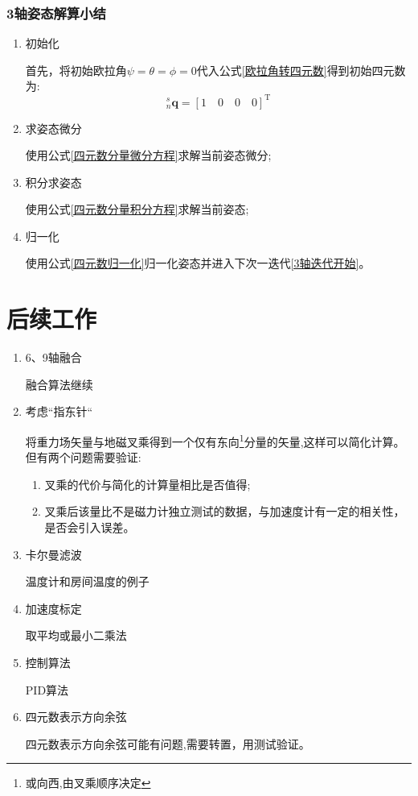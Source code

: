 \documentclass[12pt,a4paper]{article}
\renewcommand{\citep}[1]{\textsuperscript{\cite{#1}}}
\begin{document}
\subsubsection{3轴姿态解算小结}\label{section:3轴姿态解算小结}
\begin{enumerate}
        \item 初始化 
            
            首先，将初始欧拉角$\psi=\theta=\phi=0$代入公式\ref{欧拉角转四元数}得到初始四元数为:
            \begin{equation}\label{四元数初始化}
                ^s_n\bm{q}=[1\quad 0\quad 0\quad 0]^\mathrm{T}
            \end{equation} 

        \item 求姿态微分\label{3轴迭代开始}
            
            使用公式\ref{四元数分量微分方程}求解当前姿态微分;

        \item 积分求姿态
            
            使用公式\ref{四元数分量积分方程}求解当前姿态; 

        \item 归一化 
            
            使用公式\ref{四元数归一化}归一化姿态并进入下次一迭代\ref{3轴迭代开始}。
\end{enumerate}

\section{后续工作}
\begin{enumerate}
    \item 6、9轴融合
        
        融合算法继续
    \item 考虑“指东针“

        将重力场矢量与地磁叉乘得到一个仅有东向\footnote{或向西,由叉乘顺序决定}分量的矢量,这样可以简化计算。但有两个问题需要验证:
        \begin{enumerate}
            \item 叉乘的代价与简化的计算量相比是否值得;
            \item 叉乘后该量比不是磁力计独立测试的数据，与加速度计有一定的相关性，是否会引入误差。
        \end{enumerate} 
    \item 卡尔曼滤波

        温度计和房间温度的例子
    \item 加速度标定

        取平均或最小二乘法
    \item 控制算法

        PID算法
    \item 四元数表示方向余弦
        
        四元数表示方向余弦可能有问题,需要转置\citep{捷联惯导航,9轴融合论文}，用测试验证。
\end{enumerate}

\newpage
\renewcommand\refname{参考文献}
\centering %


\end{document}
